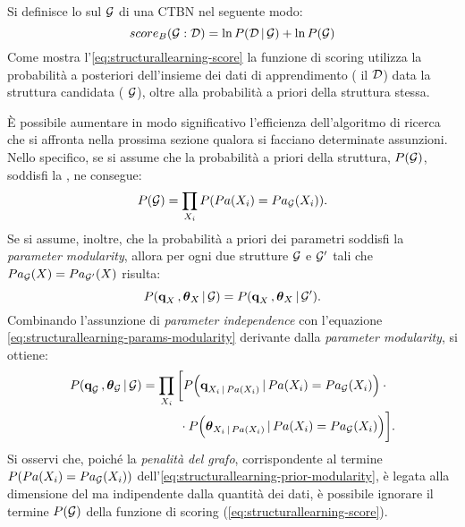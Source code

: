 Si definisce lo \emph{} sul  $\mathcal{G}$ di una \acs{CTBN} nel seguente modo:
\begin{equation}\label{eq:structurallearning-score}
score_B(\mathcal{G}:\mathcal{D})=\ln{P(\mathcal{D}\,\arrowvert\,\mathcal{G})} + \ln{P(\mathcal{G})}
\end{equation}
Come mostra l'\autoref{eq:structurallearning-score} la funzione di scoring utilizza la probabilità a posteriori dell'insieme dei dati di apprendimento (\ie{} il \trs{} $\mathcal{D}$) data la struttura candidata (\ie{} $\mathcal{G}$), oltre alla probabilità a priori della struttura stessa.

\`E possibile aumentare in modo significativo l'efficienza dell'algoritmo di ricerca che si affronta nella prossima sezione qualora si facciano determinate assunzioni. Nello specifico, se si assume che la probabilità a priori della struttura, $P(\mathcal{G})$, soddisfi la \emph{}, ne consegue:
\begin{equation}\label{eq:structurallearning-prior-modularity}
P(\mathcal{G})=\prod_{\mathnormal{X}_i} P(Pa(\mathnormal{X}_i) = Pa_{\mathcal{G}}(\mathnormal{X}_i))\text{.}
\end{equation}
Se si assume, inoltre, che la probabilità a priori dei parametri soddisfi la \emph{parameter modularity}, allora per ogni due strutture $\mathcal{G}$ e $\mathcal{G}^\prime$ tali che $Pa_{\mathcal{G}}(\mathnormal{X}) = Pa_{\mathcal{G}^\prime}(\mathnormal{X})$ risulta:
\begin{equation}\label{eq:structurallearning-params-modularity}
P(\boldsymbol{\textbf{\text{q}}}_{\mathnormal{X}}\,,\boldsymbol{\textbf{\text{$\theta$}}}_{\mathnormal{X}}\,\arrowvert\,\mathcal{G}) = P(\boldsymbol{\textbf{\text{q}}}_{\mathnormal{X}}\,,\boldsymbol{\textbf{\text{$\theta$}}}_{\mathnormal{X}}\,\arrowvert\,\mathcal{G}^\prime)\text{.}
\end{equation}
Combinando l'assunzione di \emph{parameter independence} con l'equazione \ref{eq:structurallearning-params-modularity} derivante dalla \emph{parameter modularity}, si ottiene:
\begin{align}\label{eq:structurallearning-params-posterior}
P(\boldsymbol{\textbf{\text{q}}}_{\mathcal{G}}\,,\boldsymbol{\textbf{\text{$\theta$}}}_{\mathcal{G}}\,\arrowvert\,\mathcal{G}) &= \prod_{\mathnormal{X}_i} \bigg[ P\Big(\boldsymbol{\textbf{\text{q}}}_{\mathnormal{X}_i\,\arrowvert\,Pa(\mathnormal{X}_i)}\,\arrowvert\,Pa(\mathnormal{X}_i)=Pa_{\mathcal{G}}(\mathnormal{X}_i)\Big) \cdot \bigg.\nonumber\\
& \quad \bigg.{} \qquad \cdot P\Big(\boldsymbol{\textbf{\text{$\theta$}}}_{\mathnormal{X}_i\,\arrowvert\,Pa(\mathnormal{X}_i)}\,\arrowvert\,Pa(\mathnormal{X}_i)=Pa_{\mathcal{G}}(\mathnormal{X}_i)\Big) \bigg]\text{.}
\end{align}
Si osservi che, poiché la \emph{penalità del grafo}, corrispondente al termine $P(Pa(\mathnormal{X}_i) = Pa_{\mathcal{G}}(\mathnormal{X}_i))$ dell'\autoref{eq:structurallearning-prior-modularity}, è legata alla dimensione del  ma indipendente dalla quantità dei dati, è possibile ignorare il termine $P(\mathcal{G})$ della funzione di scoring (\autoref{eq:structurallearning-score}).

